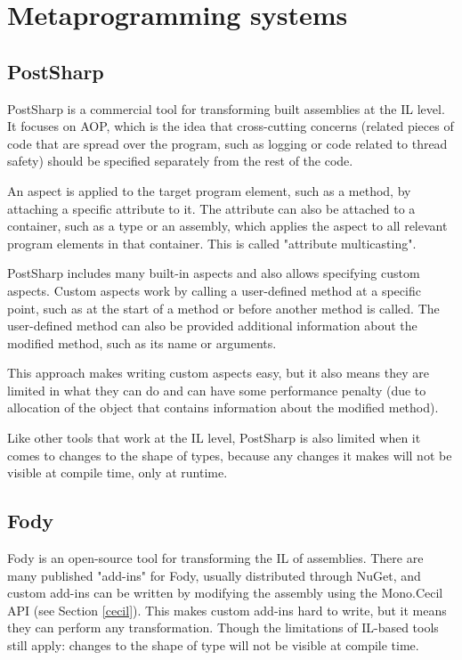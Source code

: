 \section{Metaprogramming systems}
\label{metaprogramming}


\subsection{PostSharp}

PostSharp \cite{postsharp} is a commercial tool for transforming built assemblies at the \ac{IL} level. It focuses on \ac{AOP}, which is the idea that cross-cutting concerns (related pieces of code that are spread over the program, such as logging or code related to thread safety) should be specified separately from the rest of the code.

An aspect is applied to the target program element, such as a method, by attaching a specific attribute to it. The attribute can also be attached to a container, such as a type or an assembly, which applies the aspect to all relevant program elements in that container. This is called "attribute multicasting".

PostSharp includes many built-in aspects and also allows specifying custom aspects. Custom aspects work by calling a user-defined method at a specific point, such as at the start of a method or before another method is called. The user-defined method can also be provided additional information about the modified method, such as its name or arguments.

This approach makes writing custom aspects easy, but it also means they are limited in what they can do and can have some performance penalty (due to allocation of the object that contains information about the modified method).

Like other tools that work at the \ac{IL} level, PostSharp is also limited when it comes to changes to the shape of types, because any changes it makes will not be visible at compile time, only at runtime.

\subsection{Fody}

Fody \cite{fody} is an open-source tool for transforming the \ac{IL} of assemblies. There are many published "add-ins" for Fody, usually distributed through NuGet, and custom add-ins can be written by modifying the assembly using the Mono.Cecil \ac{API} (see Section \ref{cecil}). This makes custom add-ins hard to write, but it means they can perform any transformation. Though the limitations of \ac{IL}-based tools still apply: changes to the shape of type will not be visible at compile time.

